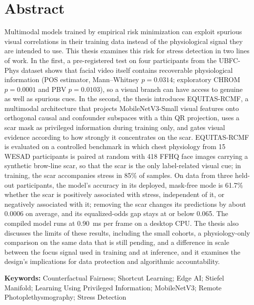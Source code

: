\section*{Abstract}
Multimodal models trained by empirical risk minimization can exploit spurious visual correlations in their training data instead of the physiological signal they are intended to use. This thesis examines this risk for stress detection in two lines of work. In the first, a pre-registered test on four participants from the UBFC-Phys dataset shows that facial video itself contains recoverable physiological information (POS estimator, Mann--Whitney $p = 0.0314$; exploratory CHROM $p = 0.0001$ and PBV $p = 0.0103$), so a visual branch can have access to genuine as well as spurious cues. In the second, the thesis introduces EQUITAS-RCMF, a multimodal architecture that projects MobileNetV3-Small visual features onto orthogonal causal and confounder subspaces with a thin QR projection, uses a scar mask as privileged information during training only, and gates visual evidence according to how strongly it concentrates on the scar. EQUITAS-RCMF is evaluated on a controlled benchmark in which chest physiology from 15 WESAD participants is paired at random with 418 FFHQ face images carrying a synthetic brow-line scar, so that the scar is the only label-related visual cue; in training, the scar accompanies stress in 85\% of samples. On data from three held-out participants, the model's accuracy in its deployed, mask-free mode is 61.7\% whether the scar is positively associated with stress, independent of it, or negatively associated with it; removing the scar changes its predictions by about 0.0006 on average, and its equalized-odds gap stays at or below 0.065. The compiled model runs at 0.90~ms per frame on a desktop CPU. The thesis also discusses the limits of these results, including the small cohorts, a physiology-only comparison on the same data that is still pending, and a difference in scale between the focus signal used in training and at inference, and it examines the design's implications for data protection and algorithmic accountability.

\vspace{0.75cm}

\noindent\textbf{Keywords:} Counterfactual Fairness; Shortcut Learning; Edge AI; Stiefel Manifold; Learning Using Privileged Information; MobileNetV3; Remote Photoplethysmography; Stress Detection
